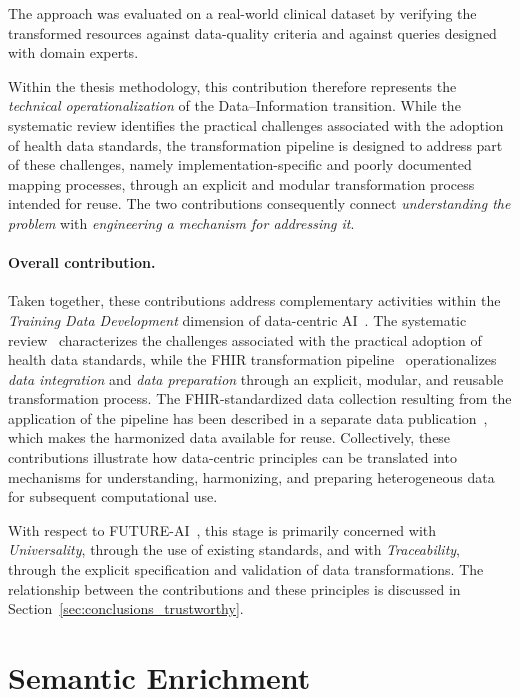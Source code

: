 The approach was evaluated on a real-world clinical dataset by verifying the transformed resources against data-quality criteria and against queries designed with domain experts.

Within the thesis methodology, this contribution therefore represents the \emph{technical operationalization} of the Data--Information transition. While the systematic review identifies the practical challenges associated with the adoption of health data standards, the transformation pipeline is designed to address part of these challenges, namely implementation-specific and poorly documented mapping processes, through an explicit and modular transformation process intended for reuse. The two contributions consequently connect \emph{understanding the problem} with \emph{engineering a mechanism for addressing it}.

\paragraph{Overall contribution.}
Taken together, these contributions address complementary activities within the \emph{Training Data Development} dimension of data-centric AI~\cite{zha_data-centric_2025}. The systematic review~\cite{marfoglia2026challenges} characterizes the challenges associated with the practical adoption of health data standards, while the FHIR transformation pipeline~\cite{marfoglia_towards_2025} operationalizes \emph{data integration} and \emph{data preparation} through an explicit, modular, and reusable transformation process. The FHIR-standardized data collection resulting from the application of the pipeline has been described in a separate data publication~\cite{arcobelli2024fhir}, which makes the harmonized data available for reuse. Collectively, these contributions illustrate how data-centric principles can be translated into mechanisms for understanding, harmonizing, and preparing heterogeneous data for subsequent computational use.

With respect to FUTURE-AI~\cite{lekadir_future-ai_2025}, this stage is primarily concerned with \emph{Universality}, through the use of existing standards, and with \emph{Traceability}, through the explicit specification and validation of data transformations. The relationship between the contributions and these principles is discussed in Section~\ref{sec:conclusions_trustworthy}.

\section{Semantic Enrichment}
\label{sec:semantic_enrichment}

